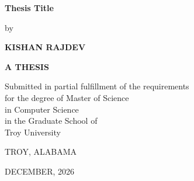 
\pagestyle{empty}

\newcommand{\thesistitle}{Thesis Title}
\newcommand{\authorname}{KISHAN RAJDEV}

\newcommand{\thesisdegree}{Master of Science}
\newcommand{\program}{Computer Science}
\newcommand{\gradmonth}{DECEMBER}
\newcommand{\gradyear}{2026}
\newcommand{\campusname}{Troy}
\newcommand{\studentid}{1709777}
\newcommand{\advisorname}{Dr. Hyung Jae Chang}
\newcommand{\deanname}{Dr. Govind Menon}
\newcommand{\gradschooldean}{Dr. Mary Anne Templeton}
\renewcommand{\baselinestretch}{1}\normalsize


\begin{titlepage}
    \thispagestyle{empty}

    \begin{center}

        \vspace*{1.0cm}

        \Large
        \textbf{\thesistitle}

        \vspace{1.5cm}

        \normalsize
        by

        \vspace{0.75cm}

        \large
        \textbf{\authorname}

        \vspace{2.5cm}

        \normalsize
        \textbf{A THESIS}

        \vspace{2.5cm}

        Submitted in partial fulfillment of the requirements\\
        for the degree of \thesisdegree\\
        in \program\\
        in the Graduate School of\\
        Troy University

        \vspace{2.5cm}

        TROY, ALABAMA
      
        \vspace{0.25cm}
      
        \gradmonth, \gradyear

    \end{center}

\end{titlepage}


